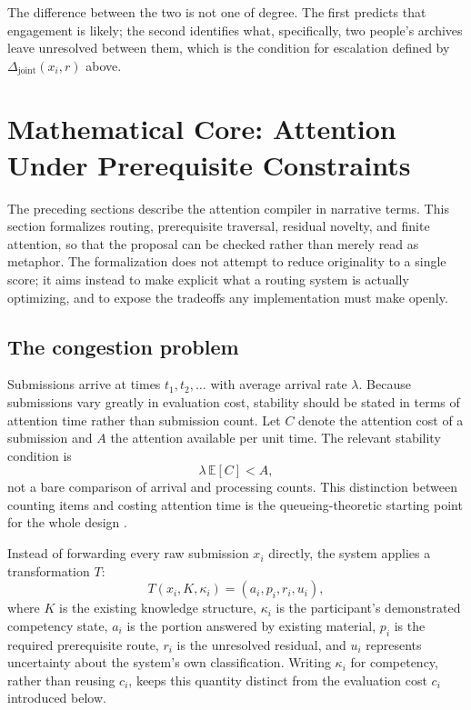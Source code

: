 \documentclass[11pt]{article}
\begin{document}
The difference between the two is not one of degree. The first predicts that engagement is likely; the second identifies what, specifically, two people's archives leave unresolved between them, which is the condition for escalation defined by $\Delta_{\mathrm{joint}}(x_i,r)$ above.

\section{Mathematical Core: Attention Under Prerequisite Constraints}

The preceding sections describe the attention compiler in narrative terms. This section formalizes routing, prerequisite traversal, residual novelty, and finite attention, so that the proposal can be checked rather than merely read as metaphor. The formalization does not attempt to reduce originality to a single score; it aims instead to make explicit what a routing system is actually optimizing, and to expose the tradeoffs any implementation must make openly.

\subsection{The congestion problem}

Submissions arrive at times $t_1, t_2, \dots$ with average arrival rate $\lambda$. Because submissions vary greatly in evaluation cost, stability should be stated in terms of attention time rather than submission count. Let $C$ denote the attention cost of a submission and $A$ the attention available per unit time. The relevant stability condition is
\[
\lambda\,\mathbb{E}[C] < A,
\]
not a bare comparison of arrival and processing counts. This distinction between counting items and costing attention time is the queueing-theoretic starting point for the whole design \cite{kleinrock1975}.

Instead of forwarding every raw submission $x_i$ directly, the system applies a transformation $T$:
\[
T(x_i, K, \kappa_i) = (a_i, p_i, r_i, u_i),
\]
where $K$ is the existing knowledge structure, $\kappa_i$ is the participant's demonstrated competency state, $a_i$ is the portion answered by existing material, $p_i$ is the required prerequisite route, $r_i$ is the unresolved residual, and $u_i$ represents uncertainty about the system's own classification. Writing $\kappa_i$ for competency, rather than reusing $c_i$, keeps this quantity distinct from the evaluation cost $c_i$ introduced below.
\end{document}
